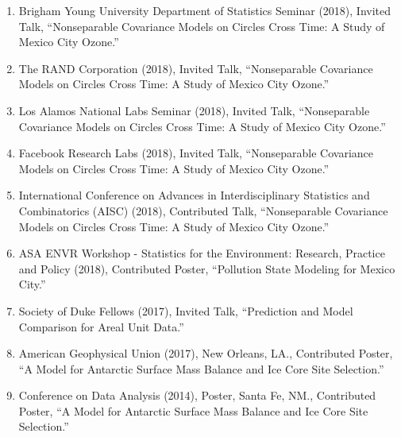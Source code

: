 \documentclass[12pt]{article}
\begin{document}
\begin{enumerate}[label=$\bullet$]
\item Brigham Young University Department of Statistics Seminar (2018), Invited Talk, ``Nonseparable Covariance Models on Circles Cross Time: A Study of Mexico City Ozone.''
\item The RAND Corporation (2018), Invited Talk, ``Nonseparable Covariance Models on Circles Cross Time: A Study of Mexico City Ozone.''
\item Los Alamos National Labs Seminar (2018), Invited Talk, ``Nonseparable Covariance Models on Circles Cross Time: A Study of Mexico City Ozone.''
\item Facebook Research Labs (2018), Invited Talk, ``Nonseparable Covariance Models on Circles Cross Time: A Study of Mexico City Ozone.''
\item International Conference on Advances in Interdisciplinary Statistics and Combinatorics (AISC) (2018), Contributed Talk, ``Nonseparable Covariance Models on Circles Cross Time: A Study of Mexico City Ozone.''
\item ASA ENVR Workshop - Statistics for the Environment: Research, Practice and Policy (2018), Contributed Poster, ``Pollution State Modeling for Mexico City.''
\item Society of Duke Fellows (2017), Invited Talk, ``Prediction and Model Comparison for Areal Unit Data.''
\item American Geophysical Union (2017), New Orleans, LA., Contributed Poster, ``A Model for Antarctic Surface Mass Balance and Ice Core Site Selection.'' 
\item Conference on Data Analysis (2014), Poster, Santa Fe, NM., Contributed Poster, ``A Model for Antarctic Surface Mass Balance and Ice Core Site Selection.'' 



\end{enumerate}
\end{document}

